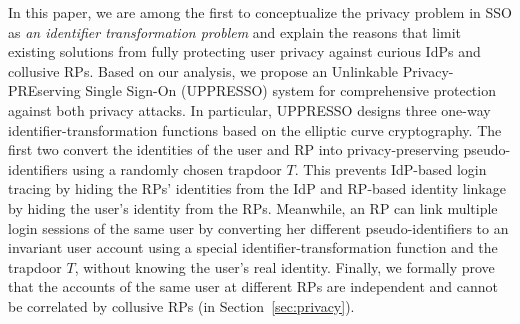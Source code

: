 In this paper, we are among the first to conceptualize the privacy problem in SSO as {\em an identifier transformation problem} and explain the reasons that limit existing solutions from fully protecting user privacy against curious IdPs and collusive RPs. Based on our analysis, we propose an Unlinkable Privacy-PREserving Single Sign-On (UPPRESSO) system for comprehensive protection against both privacy attacks. In particular, UPPRESSO designs three one-way identifier-transformation functions based on the elliptic curve cryptography. The first two convert the identities of the user and RP into privacy-preserving pseudo-identifiers using a randomly chosen trapdoor $T$. This prevents IdP-based login tracing by hiding the RPs' identities from the IdP and RP-based identity linkage by hiding the user's identity from the RPs. Meanwhile, an RP can link multiple login sessions of the same user by converting her different pseudo-identifiers to an invariant user account using a special identifier-transformation function and the trapdoor $T$, without knowing the user's real identity. Finally, we formally prove that the accounts of the same user at different RPs are independent and cannot be correlated by collusive RPs (in Section~\ref{sec:privacy}).
